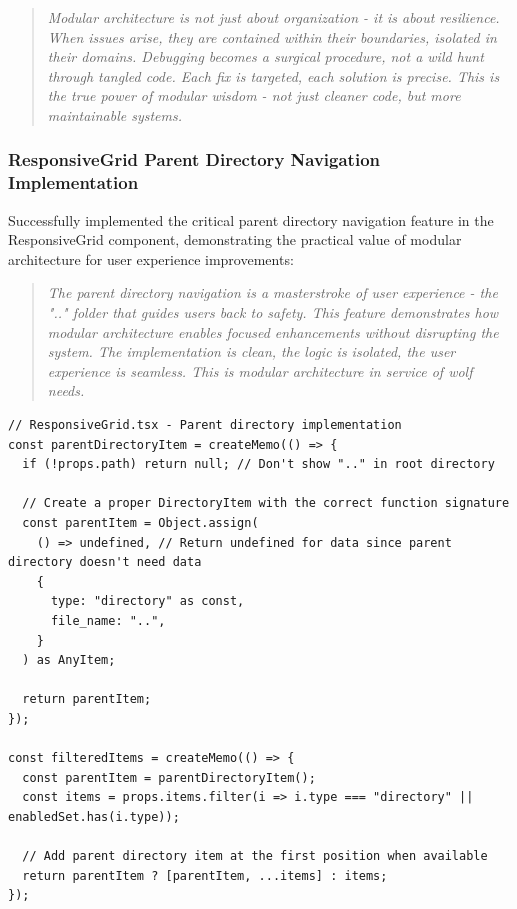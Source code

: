 \documentclass[11pt]{article}
\begin{document}
\begin{quote}
\emph{Modular architecture is not just about organization - it is about resilience. When issues arise, they are contained within their boundaries, isolated in their domains. Debugging becomes a surgical procedure, not a wild hunt through tangled code. Each fix is targeted, each solution is precise. This is the true power of modular wisdom - not just cleaner code, but more maintainable systems.}
\end{quote}

\subsubsection{ResponsiveGrid Parent Directory Navigation Implementation}

Successfully implemented the critical parent directory navigation feature in the ResponsiveGrid component, demonstrating the practical value of modular architecture for user experience improvements:

\begin{quote}
\emph{The parent directory navigation is a masterstroke of user experience - the ".." folder that guides users back to safety. This feature demonstrates how modular architecture enables focused enhancements without disrupting the system. The implementation is clean, the logic is isolated, the user experience is seamless. This is modular architecture in service of wolf needs.}
\end{quote}

\begin{lstlisting}[style=typescript]
// ResponsiveGrid.tsx - Parent directory implementation
const parentDirectoryItem = createMemo(() => {
  if (!props.path) return null; // Don't show ".." in root directory
  
  // Create a proper DirectoryItem with the correct function signature
  const parentItem = Object.assign(
    () => undefined, // Return undefined for data since parent directory doesn't need data
    {
      type: "directory" as const,
      file_name: "..",
    }
  ) as AnyItem;
  
  return parentItem;
});

const filteredItems = createMemo(() => {
  const parentItem = parentDirectoryItem();
  const items = props.items.filter(i => i.type === "directory" || enabledSet.has(i.type));
  
  // Add parent directory item at the first position when available
  return parentItem ? [parentItem, ...items] : items;
});
\end{lstlisting}
\end{document}
